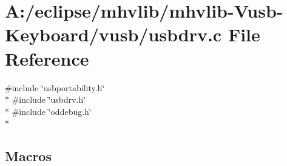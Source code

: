 \hypertarget{mhvlib-_vusb-_keyboard_2vusb_2usbdrv_8c}{\section{A\-:/eclipse/mhvlib/mhvlib-\/\-Vusb-\/\-Keyboard/vusb/usbdrv.c File Reference}
\label{mhvlib-_vusb-_keyboard_2vusb_2usbdrv_8c}
}
{\ttfamily \#include \char`\"{}usbportability.\-h\char`\"{}}\\*
{\ttfamily \#include \char`\"{}usbdrv.\-h\char`\"{}}\\*
{\ttfamily \#include \char`\"{}oddebug.\-h\char`\"{}}\\*
\subsection*{Macros}
